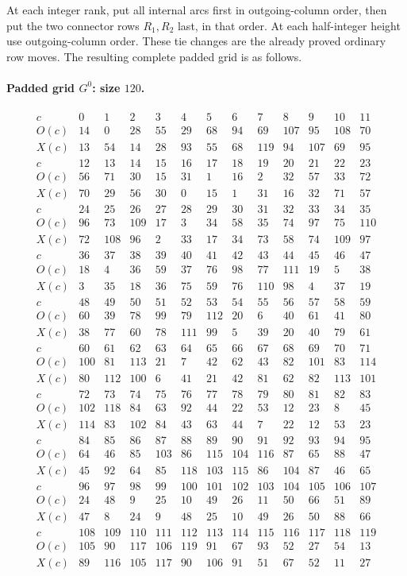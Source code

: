 \documentclass[11pt,a4paper]{article}
\theoremstyle{remark}
\begin{document}
At each integer rank, put all internal arcs first in outgoing-column
order, then put the two connector rows $R_1,R_2$ last, in that order.
At each half-integer height use outgoing-column order.  These
tie changes are the already proved ordinary row moves.  The resulting
complete padded grid is as follows.

\paragraph{Padded grid $G^0$: size $120$.}\mbox{}
\[
\begin{array}{c|rrrrrrrrrrrr}
c&0&1&2&3&4&5&6&7&8&9&10&11\\
O(c)&14&0&28&55&29&68&94&69&107&95&108&70\\
X(c)&13&54&14&28&93&55&68&119&94&107&69&95\\
\hline
c&12&13&14&15&16&17&18&19&20&21&22&23\\
O(c)&56&71&30&15&31&1&16&2&32&57&33&72\\
X(c)&70&29&56&30&0&15&1&31&16&32&71&57\\
\hline
c&24&25&26&27&28&29&30&31&32&33&34&35\\
O(c)&96&73&109&17&3&34&58&35&74&97&75&110\\
X(c)&72&108&96&2&33&17&34&73&58&74&109&97\\
\hline
c&36&37&38&39&40&41&42&43&44&45&46&47\\
O(c)&18&4&36&59&37&76&98&77&111&19&5&38\\
X(c)&3&35&18&36&75&59&76&110&98&4&37&19\\
\hline
c&48&49&50&51&52&53&54&55&56&57&58&59\\
O(c)&60&39&78&99&79&112&20&6&40&61&41&80\\
X(c)&38&77&60&78&111&99&5&39&20&40&79&61\\
\hline
c&60&61&62&63&64&65&66&67&68&69&70&71\\
O(c)&100&81&113&21&7&42&62&43&82&101&83&114\\
X(c)&80&112&100&6&41&21&42&81&62&82&113&101\\
\hline
c&72&73&74&75&76&77&78&79&80&81&82&83\\
O(c)&102&118&84&63&92&44&22&53&12&23&8&45\\
X(c)&114&83&102&84&43&63&44&7&22&12&53&23\\
\hline
c&84&85&86&87&88&89&90&91&92&93&94&95\\
O(c)&64&46&85&103&86&115&104&116&87&65&88&47\\
X(c)&45&92&64&85&118&103&115&86&104&87&46&65\\
\hline
c&96&97&98&99&100&101&102&103&104&105&106&107\\
O(c)&24&48&9&25&10&49&26&11&50&66&51&89\\
X(c)&47&8&24&9&48&25&10&49&26&50&88&66\\
\hline
c&108&109&110&111&112&113&114&115&116&117&118&119\\
O(c)&105&90&117&106&119&91&67&93&52&27&54&13\\
X(c)&89&116&105&117&90&106&91&51&67&52&11&27\\
\end{array}
\]
\end{document}
